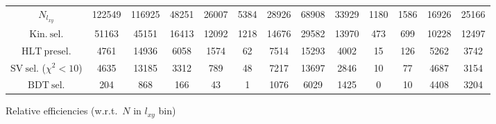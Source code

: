 \documentclass[10pt,a4paper]{article}
\begin{document}
\begin{landscape}
{\begin{tabular}{c|cccc|cccc|cccc}
\midrule
$N_{l_{xy}}$ & 122549 & 116925 & 48251 & 26007 & 5384 & 28926 & 68908 & 33929 & 1180 & 1586 & 16926 & 25166\\
$\mathrm{Kin.\ sel.}$ & 51163 & 45151 & 16413 & 12092 & 1218 & 14676 & 29582 & 13970 & 473 & 699 & 10228 & 12497\\
$\mathrm{HLT\ presel.}$ & 4761 & 14936 & 6058 & 1574 & 62 & 7514 & 15293 & 4002 & 15 & 126 & 5262 & 3742\\
$\mathrm{SV\ sel.}$ ($\chi^2{<}10$) & 4635 & 13185 & 3312 & 789 & 48 & 7217 & 13697 & 2846 & 10 & 77 & 4687 & 3154\\
$\mathrm{BDT\ sel.}$ & 204 & 868 & 166 & 43 & 1 & 1076 & 6029 & 1425 & 0 & 10 & 4408 & 3204\\
\bottomrule
\end{tabular}}

\vspace{18pt}

Relative efficiencies (w.r.t.\ $N$ in $l_{xy}$ bin)


\end{landscape}
\end{document}
